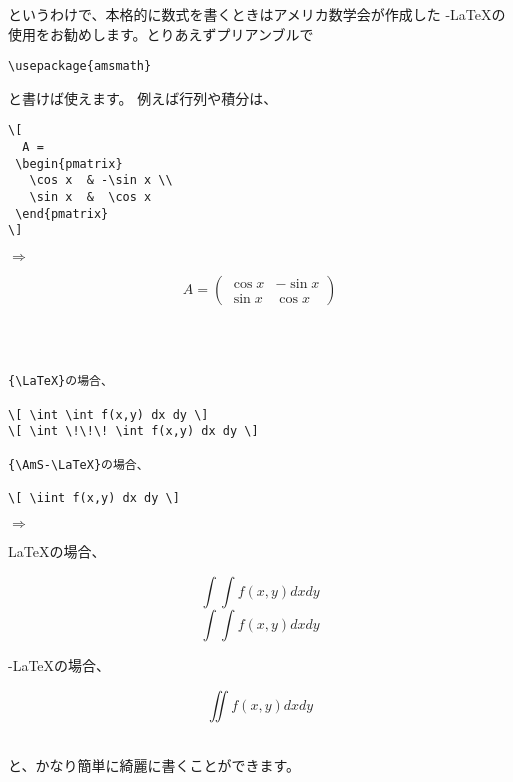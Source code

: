 というわけで、本格的に数式を書くときはアメリカ数学会が作成した
{\AmS-\LaTeX}の使用をお勧めします。とりあえずプリアンブルで
\begin{screen}
\verb+\usepackage{amsmath}+
\end{screen}
と書けば使えます。
例えば行列や積分は、\\
\begin{minipage}[c]{.50\textwidth}
\begin{screen}
\small
\begin{verbatim}
\[
  A =
 \begin{pmatrix}
   \cos x  & -\sin x \\
   \sin x  &  \cos x
 \end{pmatrix}
\]
\end{verbatim}
\end{screen}
\end{minipage}%
$\Rightarrow$
\begin{minipage}{.45\textwidth}
\begin{shadebox}
\[
  A =
 \begin{pmatrix}
   \cos x  & -\sin x \\
   \sin x  &  \cos x
 \end{pmatrix}
\]
\end{shadebox}
\end{minipage}
\vspace*{1mm}\\
\\
\begin{minipage}[c]{.50\textwidth}
\begin{screen}
\small
\begin{verbatim}
{\LaTeX}の場合、

\[ \int \int f(x,y) dx dy \]
\[ \int \!\!\! \int f(x,y) dx dy \]

{\AmS-\LaTeX}の場合、

\[ \iint f(x,y) dx dy \]
\end{verbatim}
\end{screen}
\end{minipage}%
$\Rightarrow$
\begin{minipage}{.45\textwidth}
\begin{shadebox}
{\LaTeX}の場合、

\[ \int \int f(x,y) dx dy \]
\[ \int \!\!\! \int f(x,y) dx dy \]

{\AmS-\LaTeX}の場合、

\[ \iint f(x,y) dx dy \]
\end{shadebox}
\end{minipage}
\vspace*{1mm}\\
と、かなり簡単に綺麗に書くことができます。

